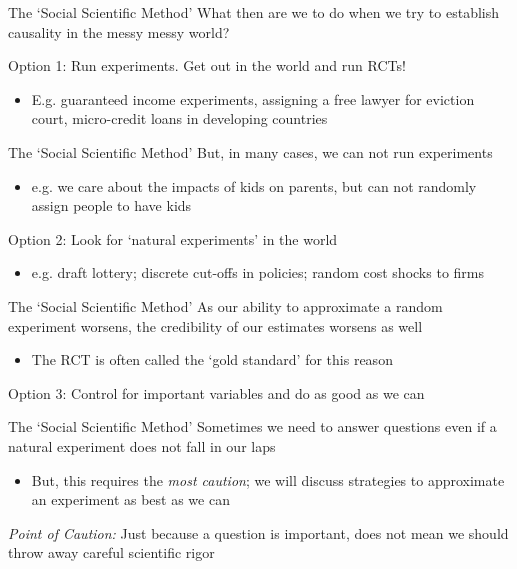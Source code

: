 \documentclass[aspectratio=169,t,11pt,table]{beamer}
\begin{document}
\begin{frame}{The `Social Scientific Method'}
  What then are we to do when we try to establish causality in the messy messy world?

  \bigskip
  {\color{magenta} Option 1}: Run experiments. Get out in the world and run RCTs! 
  \begin{itemize}
    \item E.g. guaranteed income experiments, assigning a free lawyer for eviction court, micro-credit loans in developing countries
  \end{itemize}
\end{frame}

\begin{frame}{The `Social Scientific Method'}
  But, in many cases, we can not run experiments
  \begin{itemize}
    \item e.g. we care about the impacts of kids on parents, but can not randomly assign people to have kids
  \end{itemize}

  \bigskip
  {\color{magenta} Option 2}: Look for `natural experiments' in the world
  \begin{itemize}
    \item e.g. draft lottery; discrete cut-offs in policies; random cost shocks to firms
  \end{itemize}
\end{frame}

\begin{frame}{The `Social Scientific Method'}
  As our ability to approximate a random experiment worsens, the credibility of our estimates worsens as well
  \begin{itemize}
    \item The RCT is often called the `gold standard' for this reason
  \end{itemize}

  \bigskip
  {\color{magenta} Option 3}: Control for important variables and do as good as we can
\end{frame}

\begin{frame}{The `Social Scientific Method'}
  Sometimes we need to answer questions even if a natural experiment does not fall in our laps
  \begin{itemize}    
    \item But, this requires the \emph{most caution}; we will discuss strategies to approximate an experiment as best as we can
  \end{itemize}

  \bigskip
  \emph{Point of Caution:} Just because a question is important, does not mean we should throw away careful scientific rigor
\end{frame}
\end{document}
